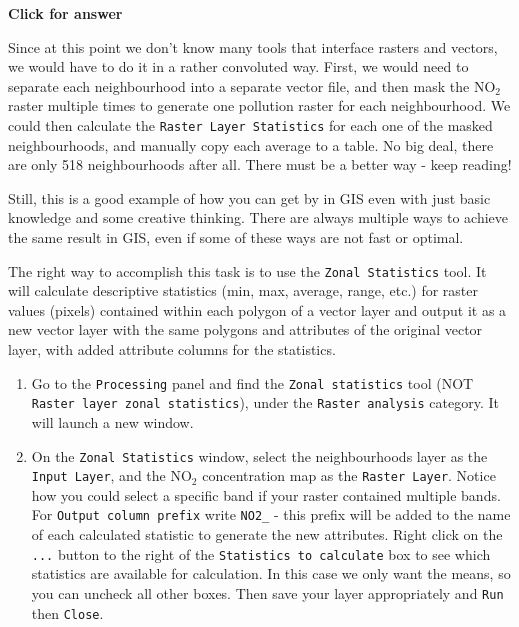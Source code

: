\documentclass[
  letterpaper,
  DIV=11,
  numbers=noendperiod]{scrreprt}
\begin{document}
\begin{tcolorbox}[enhanced jigsaw, leftrule=.75mm, colframe=quarto-callout-important-color-frame, breakable, toprule=.15mm, bottomrule=.15mm, arc=.35mm, rightrule=.15mm, opacityback=0, colback=white, left=2mm]

\vspace{-3mm}\textbf{Click for answer}\vspace{3mm}

Since at this point we don't know many tools that interface rasters and
vectors, we would have to do it in a rather convoluted way. First, we
would need to separate each neighbourhood into a separate vector file,
and then mask the NO\(_2\) raster multiple times to generate one
pollution raster for each neighbourhood. We could then calculate the
\texttt{Raster\ Layer\ Statistics} for each one of the masked
neighbourhoods, and manually copy each average to a table. No big deal,
there are only 518 neighbourhoods after all. There must be a better way
- keep reading!

Still, this is a good example of how you can get by in GIS even with
just basic knowledge and some creative thinking. There are always
multiple ways to achieve the same result in GIS, even if some of these
ways are not fast or optimal.

\end{tcolorbox}

The right way to accomplish this task is to use the
\texttt{Zonal\ Statistics} tool. It will calculate descriptive
statistics (min, max, average, range, etc.) for raster values (pixels)
contained within each polygon of a vector layer and output it as a new
vector layer with the same polygons and attributes of the original
vector layer, with added attribute columns for the statistics.

\begin{enumerate}
\def\labelenumi{(\arabic{enumi})}
\setcounter{enumi}{325}
\item
  Go to the \texttt{Processing} panel and find the
  \texttt{Zonal\ statistics} tool (NOT
  \texttt{Raster\ layer\ zonal\ statistics}), under the
  \texttt{Raster\ analysis} category. It will launch a new window.
\item
  On the \texttt{Zonal\ Statistics} window, select the neighbourhoods
  layer as the \texttt{Input\ Layer}, and the NO\(_2\) concentration map
  as the \texttt{Raster\ Layer}. Notice how you could select a specific
  band if your raster contained multiple bands. For
  \texttt{Output\ column\ prefix} write \texttt{NO2\_} - this prefix
  will be added to the name of each calculated statistic to generate the
  new attributes. Right click on the \texttt{...} button to the right of
  the \texttt{Statistics\ to\ calculate} box to see which statistics are
  available for calculation. In this case we only want the means, so you
  can uncheck all other boxes. Then save your layer appropriately and
  \texttt{Run} then \texttt{Close}.
\end{enumerate}
\end{document}
